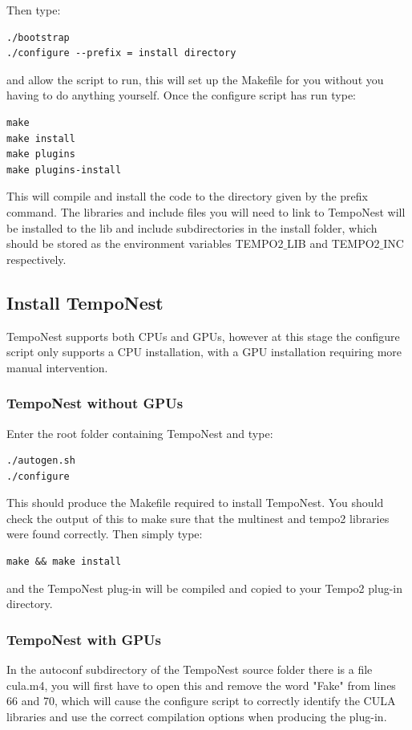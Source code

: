 \documentclass[%
 preprint,
 amsmath,amssymb,amsfonts,
 aps,
]{revtex4-1}
\begin{document}
Then type:
\begin{lstlisting}
./bootstrap
./configure --prefix = install directory
\end{lstlisting}
 and allow the script to run, this will set up the Makefile for you without you having to do anything yourself.  Once the configure script has run type:
\begin{lstlisting}
make
make install
make plugins
make plugins-install
\end{lstlisting}

This will compile and install the code to the directory given by the prefix command.  The libraries and include files you will need to link to TempoNest will be installed to the lib and include subdirectories in the install folder, which should be stored as the environment variables TEMPO2$\_$LIB and TEMPO2$\_$INC respectively.

\subsection{Install TempoNest}

TempoNest supports both CPUs and GPUs, however at this stage the configure script only supports a CPU installation, with a GPU installation requiring more manual intervention.


\subsubsection{TempoNest without GPUs}

Enter the root folder containing TempoNest and type:
%
\begin{lstlisting}
./autogen.sh
./configure
\end{lstlisting}
%
This should produce the Makefile required to install TempoNest.  You should check the output of this to make sure that the multinest and tempo2 libraries were found correctly.
Then simply type:
\begin{lstlisting}
make && make install
\end{lstlisting}
%
and the TempoNest plug-in will be compiled and copied to your Tempo2 plug-in directory.

\subsubsection{TempoNest with GPUs}

In the autoconf subdirectory of the TempoNest source folder there is a file cula.m4, you will first have to open this and remove the word "Fake" from lines 66 and 70, which will cause the configure script to correctly identify the CULA libraries and use the correct compilation options when producing the plug-in.
\end{document}
